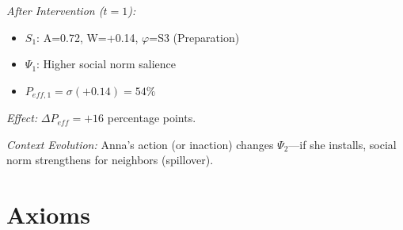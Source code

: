 \textit{After Intervention ($t=1$):}
\begin{itemize}
\item $S_1$: A=0.72, W=+0.14, $\varphi$=S3 (Preparation)
\item $\Psi_1$: Higher social norm salience
\item $P_{eff,1} = \sigma(+0.14) = 54\%$
\end{itemize}

\textit{Effect:} $\Delta P_{eff} = +16$ percentage points.

\textit{Context Evolution:}
Anna's action (or inaction) changes $\Psi_2$---if she installs, social norm strengthens for neighbors (spillover).

\section{Axioms}
\label{sec:mp-axioms}
\label{ax:mp-core}

